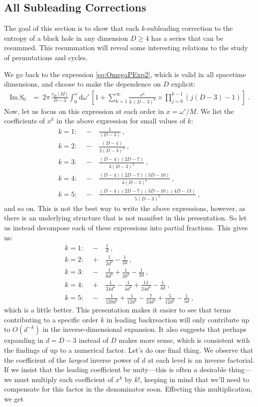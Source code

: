 \documentclass[a4paper,11pt]{article}
\newcommand{\dd}[1]{\text{d}#1 \, }
\newcommand{\im}{\text{Im} \,}
\begin{document}
\subsection{All Subleading Corrections}
\label{sec:AllSubLead}
The goal of this section is to show that each $k$-subleading correction to the entropy of a black hole in any dimension $D \geq 4$ has a series that can be resummed. This resummation will reveal some interesting relations to the study of permutations and cycles.

We go back to the expression \eqref{eq:OmegaPExp2}, which is valid in all spacetime dimensions, and choose to make the dependence on $D$ explicit:
\begin{align}
\im S_0 &= \ 2\pi \, \frac{r_{\text{H}}[M]}{D-3} \int_{0}^{\omega} \dd{\omega'} \left[ 1 + \sum_{k=1}^{\infty} \frac{x^k}{k \, (D-3)^k} \times \prod_{j=0}^{k-1} (j(D-3)-1)  \right] \ .
\end{align}
Now, let us focus on this expression at each order in $x = \omega'/M$. We list the coefficients of $x^k$ in the above expression for small values of $k$:
\begin{align}
\nonumber k=1 : \quad -&\frac{1}{(D-3)} \ , \\
\nonumber k=2 : \quad -&\frac{(D-4)}{2(D-3)^2} \ , \\
k=3 : \quad -&\frac{(D-4)(2D-7)}{3(D-3)^3} \ , \\
\nonumber k=4 : \quad -&\frac{(D-4)(2D-7)(3D-10)}{4(D-3)^4} \ , \\
\nonumber k=5 : \quad -&\frac{(D-4)(2D-7)(3D-10)(4D-13)}{5(D-3)^5} \ ,
\end{align}
and so on. This is not the best way to write the above expressions, however, as there is an underlying structure that is not manifest in this presentation. So let us instead decompose each of these expressions into partial fractions. This gives us:
\begin{align}
\nonumber k=1 : \quad -&\frac{1}{d} \ , \\
\nonumber k=2 : \quad +&\frac{1}{2d^2} - \frac{1}{2d} \ , \\
k=3 : \quad -&\frac{1}{6d^3} + \frac{1}{2d^2} - \frac{1}{3d}\ , \\
\nonumber k=4 : \quad +&\frac{1}{24d^4} - \frac{1}{4d^3} + \frac{11}{24d^2} - \frac{1}{4d} \ , \\
\nonumber k=5 : \quad -&\frac{1}{120d^5} + \frac{1}{12d^4} - \frac{7}{24d^3} + \frac{5}{12d^2} - \frac{1}{5d} \ ,
\end{align}
which is a little better. This presentation makes it easier to see that terms contributing to a specific order $k$ in leading backreaction will only contribute up to $O(d^{-k})$ in the inverse-dimensional expansion. It also suggests that perhaps expanding in $d=D-3$ instead of $D$ makes more sense, which is consistent with the findings of \cite{EmparanTalk} up to a numerical factor. Let's do one final thing. We observe that the coefficient of the \emph{largest} inverse power of $d$ at each level is an inverse factorial. If we insist that the leading coefficient be unity---this is often a desirable thing---we must multiply each coefficient of $x^k$ by $k!$, keeping in mind that we'll need to compensate for this factor in the denominator soon. Effecting this multiplication, we get
\end{document}
